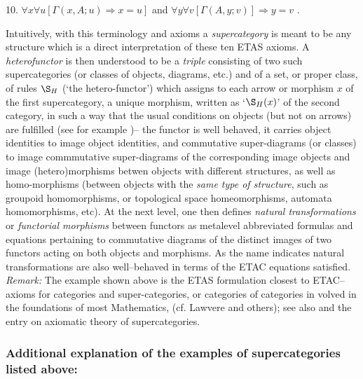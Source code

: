 \documentclass[12pt]{article}
\theoremstyle{plain}
\theoremstyle{definition}
\numberwithin{equation}{section}
\begin{document}
10. $\forall x \forall u [\Gamma (x,A; u)\Rightarrow x = u]$ and 
$ \forall y  \forall v [\Gamma (A,y; v)] \Rightarrow y = v$ .  

Intuitively, with this terminology and axioms a \textit{supercategory} is meant to be any structure which is a direct interpretation of these ten ETAS axioms. A \textit{heterofunctor} is then  understood to be a \textit{triple} consisting of two such supercategories (or classes of objects, diagrams, etc.) and of a set, or proper class,  of rules $\S_H$ (`the hetero-functor') which assigns to each arrow or morphism $x$ of the first supercategory,
a unique morphism, written as `$\S_H (x)$' of the second category, in such a way that the usual conditions on objects (but not on arrows) are fulfilled (see for example \cite {ICBM})--  the functor is well behaved, it carries object identities to image object identities, and commutative super-diagrams (or classes) to image commmutative super-diagrams of the corresponding image objects and image (hetero)morphisms betwen objects with different structures, as well as homo-morphisms (between objects with the {\em same type of structure}, such as groupoid homomorphisms, or topological space homeomorphisms, automata homomorphisms, etc).  At the next level, one then defines \emph{natural transformations} or \emph{functorial morphisms} between functors as metalevel abbreviated formulas and equations pertaining to commutative diagrams of the distinct images of two functors acting on both objects and morphisms. As the name indicates natural transformations are also well--behaved in terms of the ETAC equations satisfied. \\
{\em Remark:} The example shown above is the ETAS formulation closest to ETAC--
axioms for categories and super-categories, or categories of categories in volved in the
foundations of most Mathematics, (cf. Lawvere and others); see also \cite{LW2}
and the entry on axiomatic theory of supercategories. \\

\subsubsection{Additional explanation of the examples of supercategories listed above: } 
\end{document}
